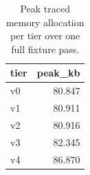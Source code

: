 \begin{table}[t]
\centering
\caption{Peak traced memory allocation per tier over one full fixture pass.}
\label{tab:memory}
\begin{tabular}{lr}
\toprule
tier & peak\_kb \\
\midrule
v0 & 80.847 \\
v1 & 80.911 \\
v2 & 80.916 \\
v3 & 82.345 \\
v4 & 86.870 \\
\bottomrule
\end{tabular}
\end{table}